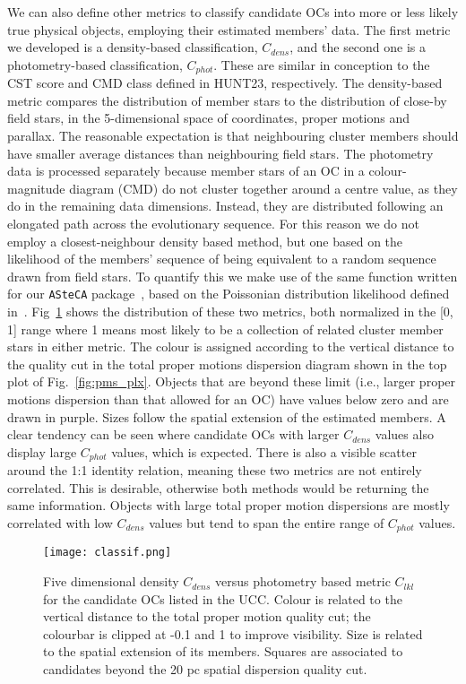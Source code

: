 \documentclass[fleqn,usenatbib]{mnras}
\begin{document}
We can also define other metrics to classify candidate OCs into more or less
likely true physical objects, employing their estimated members' data. The first
metric we developed is a density-based classification, $C_{dens}$, and the
second one is a photometry-based classification, $C_{phot}$.
These are similar in conception to the CST score and CMD class defined in
HUNT23, respectively.
The density-based metric compares the distribution of member stars to the
distribution of close-by field stars, in the 5-dimensional space of coordinates,
proper motions and parallax. The reasonable expectation is that neighbouring
cluster members should have smaller average distances than neighbouring field
stars.
The photometry data is processed separately because member stars of an OC in a
colour-magnitude diagram (CMD) do not cluster together around a centre value, as
they do in the remaining data dimensions. Instead, they are distributed
following an elongated path across the evolutionary sequence. For this reason we
do not employ a closest-neighbour density based method, but one based on the
likelihood of the members' sequence of being equivalent to a random sequence
drawn from field stars. To quantify this we make use of the same function
written for our \texttt{ASteCA} package~\citep{Perren_2015}, based on the
Poissonian distribution likelihood defined in~\cite{Tremmel_2013}.
Fig~\ref{fig:classification} shows the distribution of these two metrics, both
normalized in the [0, 1] range where 1 means most likely to be a collection
of related cluster member stars in either metric. The colour is assigned
according to the vertical distance to the quality cut in the total proper
motions dispersion diagram shown in the top plot of Fig.~\ref{fig:pms_plx}.
Objects that are beyond these limit (i.e., larger proper motions
dispersion than that allowed for an OC) have values below zero and are drawn
in purple. Sizes follow the spatial extension of the estimated members.
A clear tendency can be seen where candidate OCs with larger $C_{dens}$ values
also display large $C_{phot}$ values, which is expected. There is also a visible
scatter around the 1:1 identity relation, meaning these two metrics are not
entirely correlated. This is desirable, otherwise both methods would be
returning the same information. Objects with large total proper motion
dispersions are mostly correlated with low $C_{dens}$ values but tend to span
the entire range of $C_{phot}$ values.

\begin{figure}
	\texttt{[image: classif.png]}
    \caption{Five dimensional density $C_{dens}$ versus photometry based metric
    $C_{lkl}$ for the candidate OCs listed in the UCC. Colour is related to the
    vertical distance to the total proper motion quality cut; the colourbar is
    clipped at -0.1 and 1 to improve visibility. Size is related to
    the spatial extension of its members. Squares are
    associated to candidates beyond the 20 pc spatial dispersion quality cut.}
    \label{fig:classification}
\end{figure}
\end{document}
